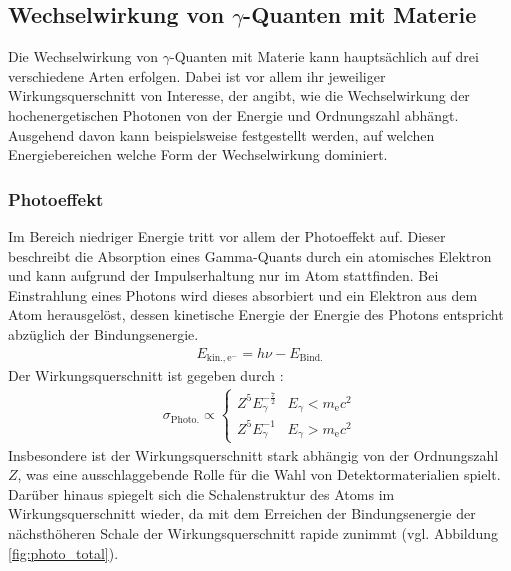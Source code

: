 \documentclass[11pt, a4paper]{article}
\numberwithin{equation}{section}
\begin{document}
\subsection{Wechselwirkung von $\gamma$-Quanten mit Materie}

Die Wechselwirkung von $\gamma$-Quanten mit Materie kann hauptsächlich auf drei verschiedene Arten erfolgen.
Dabei ist vor allem ihr jeweiliger Wirkungsquerschnitt von Interesse, der angibt, wie die Wechselwirkung der hochenergetischen Photonen von der Energie und Ordnungszahl abhängt.
Ausgehend davon kann beispielsweise festgestellt werden, auf welchen Energiebereichen welche Form der Wechselwirkung dominiert.

\subsubsection{Photoeffekt}
\label{sec:theo_photoeffekt}
Im Bereich niedriger Energie tritt vor allem der Photoeffekt auf.
Dieser beschreibt die Absorption eines Gamma-Quants durch ein atomisches Elektron und kann aufgrund der Impulserhaltung nur im Atom stattfinden.
Bei Einstrahlung eines Photons wird dieses absorbiert und ein Elektron aus dem Atom herausgelöst, dessen kinetische Energie der Energie des Photons entspricht abzüglich der Bindungsenergie.
\begin{align*}
E_\mathrm{kin., e^{-}} = h \nu - E_\mathrm{Bind.}
\end{align*}
Der Wirkungsquerschnitt ist gegeben durch \cite{siegbahn}:
\begin{align*}
	\sigma_\mathrm{Photo.} \propto
	\begin{cases}
		Z^5 E_\gamma^{-\frac{7}{2}} & E_\gamma < m_\mathrm{e} c^2 \\
		Z^5 E_\gamma^{-1} & E_\gamma > m_\mathrm{e} c^2
	\end{cases}
\end{align*}
Insbesondere ist der Wirkungsquerschnitt stark abhängig von der Ordnungszahl $Z$, was eine ausschlaggebende Rolle für die Wahl von Detektormaterialien spielt. Darüber hinaus spiegelt sich die Schalenstruktur des Atoms im Wirkungsquerschnitt wieder, da mit dem Erreichen der Bindungsenergie der nächsthöheren Schale der Wirkungsquerschnitt rapide zunimmt (vgl. Abbildung \ref{fig:photo_total}).
\end{document}
